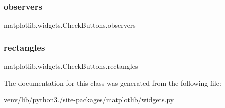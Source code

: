 \subsubsection{\texorpdfstring{observers}{observers}}
{\footnotesize\ttfamily matplotlib.\+widgets.\+Check\+Buttons.\+observers\hspace{0.3cm}{\ttfamily [static]}}

\mbox{\label{classmatplotlib_1_1widgets_1_1CheckButtons_ac37fbe05a3f11927188a0594b8ac90b6}} 
\subsubsection{\texorpdfstring{rectangles}{rectangles}}
{\footnotesize\ttfamily matplotlib.\+widgets.\+Check\+Buttons.\+rectangles}



The documentation for this class was generated from the following file\+:\begin{DoxyCompactItemize}
\item 
venv/lib/python3./site-\/packages/matplotlib/\hyperlink{widgets_8py}{widgets.\+py}\end{DoxyCompactItemize}
